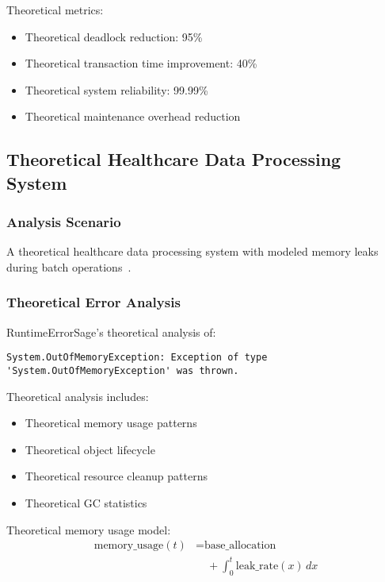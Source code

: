 Theoretical metrics:
\begin{itemize}
    \item Theoretical deadlock reduction: 95\%
    \item Theoretical transaction time improvement: 40\%
    \item Theoretical system reliability: 99.99\%
    \item Theoretical maintenance overhead reduction
\end{itemize}

\subsection{Theoretical Healthcare Data Processing System}

\subsubsection{Analysis Scenario}
A theoretical healthcare data processing system with modeled memory leaks during batch operations~\cite{memory_management_2023}.

\subsubsection{Theoretical Error Analysis}
RuntimeErrorSage's theoretical analysis of:
\begin{lstlisting}[style=csharpstyle,caption={Theoretical Memory Leak Error}]
System.OutOfMemoryException: Exception of type 'System.OutOfMemoryException' was thrown.
\end{lstlisting}

Theoretical analysis includes:
\begin{itemize}
    \item Theoretical memory usage patterns
    \item Theoretical object lifecycle
    \item Theoretical resource cleanup patterns
    \item Theoretical GC statistics
\end{itemize}

Theoretical memory usage model:
\begin{equation}
\begin{split}
\text{memory\_usage}(t) &= \text{base\_allocation} \\
&\quad + \int_{0}^{t} \text{leak\_rate}(x) \,dx
\end{split}
\end{equation}


